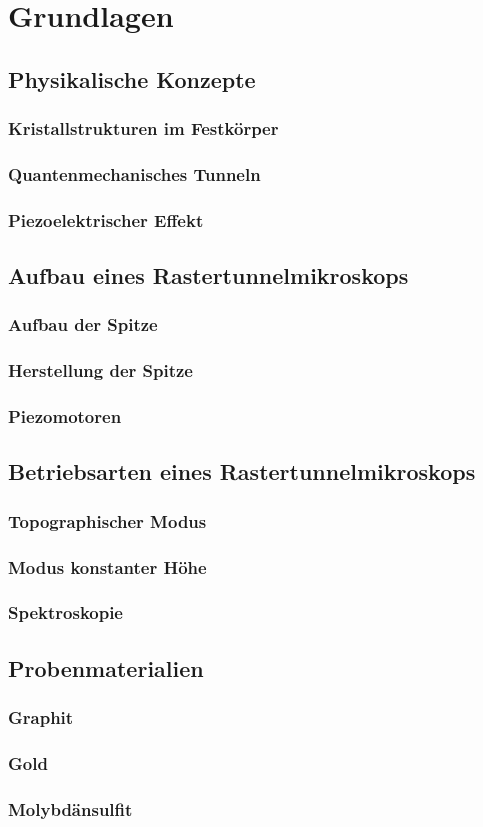 \chapter{Grundlagen}

\section{Physikalische Konzepte}
    \subsection{Kristallstrukturen im Festkörper}
    \subsection{Quantenmechanisches Tunneln}
    \subsection{Piezoelektrischer Effekt}

\section{Aufbau eines Rastertunnelmikroskops}
    \subsection{Aufbau der Spitze}
    \subsection{Herstellung der Spitze}
    \subsection{Piezomotoren}

\section{Betriebsarten eines Rastertunnelmikroskops}
    \subsection{Topographischer Modus}
    \subsection{Modus konstanter Höhe}
    \subsection{Spektroskopie}

\section{Probenmaterialien}
    \subsection{Graphit}
    \subsection{Gold}
    \subsection{Molybdänsulfit}
